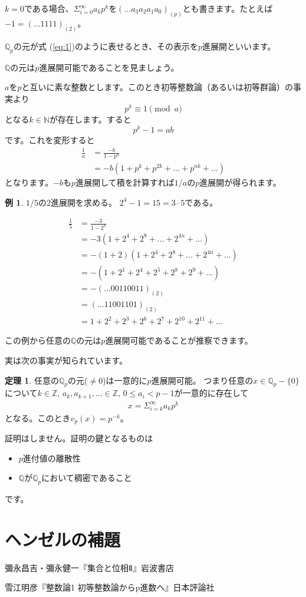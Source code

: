 \documentclass[uplatex]{jsarticle}
\newcommand{\Z}{\mathbb{Z}}
\newcommand{\Q}{\mathbb{Q}}
\theoremstyle{definition} %
\newtheorem{thm}{定理}
\newtheorem*{example*}{例}
\begin{document}
$k=0$である場合、$\Sigma_{i=0}^\infty a_k p^k$を$(\dots a_3 a_2 a_1 a_0)_{(p)}$とも書きます。たとえば $-1 = (\dots 1 1 1 1)_{(2)}$。

$\Q_p$の元が式 (\ref{eq:1})のように表せるとき、その表示を$p$進展開といいます。

$\Q$の元は$p$進展開可能であることを見ましょう。

$a$を$p$と互いに素な整数とします。このとき初等整数論（あるいは初等群論）の事実より
\[p^k \equiv 1 \pmod a\]
となる$k \in \mathbb{N}$が存在します。すると
\[p^k-1 = ab\]
です。これを変形すると
\begin{align*}
\frac{1}{a} &= \frac{-b}{1-p^k} \\
&= -b(1+p^k+p^{2k}+\dots+p^{nk}+\dots)
\end{align*}
となります。$-b$も$p$進展開して積を計算すれば$1/a$の$p$進展開が得られます。

\begin{example*}
$1/5$の$2$進展開を求める。
$2^4-1 = 15 = 3 \cdot 5$である。

\begin{align*}
\frac{1}{5} &= \frac{-3}{1-2^4} \\
&= -3 (1 + 2^4 + 2^8 + \dots+ 2^{4n} + \dots) \\
&= -(1+2) (1 + 2^4 + 2^8 + \dots+ 2^{4n} + \dots) \\
&= -(1 + 2^1 + 2^4 + 2^5 + 2^8 + 2^9 + \dots) \\
&= -(\dots 00110011)_{(2)} \\
&= (\dots 11001101)_{(2)} \\
&= 1 + 2^2 + 2^3 + 2^6 + 2^7 + 2^{10} + 2^{11} + \dots
\end{align*}
\end{example*}

この例から任意の$\Q$の元は$p$進展開可能であることが推察できます。

実は次の事実が知られています。
\begin{oframed}\begin{thm}
任意の$\Q_p$の元($\ne 0$)は一意的に$p$進展開可能。
つまり任意の$x \in \Q_p- \{0\}$について$k \in \Z$, $a_k, a_{k+1}, \dots \in \Z$, $0 \le a_i < p-1$が一意的に存在して
\begin{align}
x = \Sigma_{i=k}^\infty a_k p^k \label{eq:1}
\end{align}
となる。このとき$v_p(x) = p^{-k}$。
\end{thm}\end{oframed}
証明はしません。証明の鍵となるものは
\begin{itemize}
\item $p$進付値の離散性
\item $\Q$が$\Q_p$において稠密であること
\end{itemize}
です。

\section{ヘンゼルの補題}

\begin{thebibliography}{9}
\item 彌永昌吉・彌永健一『集合と位相Ⅱ』岩波書店
\item 雪江明彦『整数論1 初等整数論からp進数へ』日本評論社
\end{thebibliography}
\end{document}
